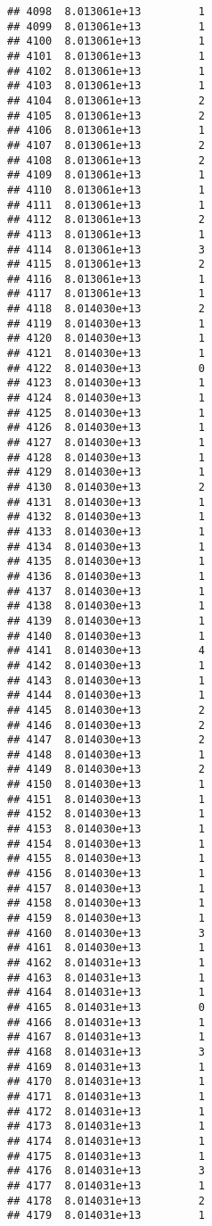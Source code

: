 \documentclass[
]{article}
\begin{document}
\begin{verbatim}
## 4098  8.013061e+13         1
## 4099  8.013061e+13         1
## 4100  8.013061e+13         1
## 4101  8.013061e+13         1
## 4102  8.013061e+13         1
## 4103  8.013061e+13         1
## 4104  8.013061e+13         2
## 4105  8.013061e+13         2
## 4106  8.013061e+13         1
## 4107  8.013061e+13         2
## 4108  8.013061e+13         2
## 4109  8.013061e+13         1
## 4110  8.013061e+13         1
## 4111  8.013061e+13         1
## 4112  8.013061e+13         2
## 4113  8.013061e+13         1
## 4114  8.013061e+13         3
## 4115  8.013061e+13         2
## 4116  8.013061e+13         1
## 4117  8.013061e+13         1
## 4118  8.014030e+13         2
## 4119  8.014030e+13         1
## 4120  8.014030e+13         1
## 4121  8.014030e+13         1
## 4122  8.014030e+13         0
## 4123  8.014030e+13         1
## 4124  8.014030e+13         1
## 4125  8.014030e+13         1
## 4126  8.014030e+13         1
## 4127  8.014030e+13         1
## 4128  8.014030e+13         1
## 4129  8.014030e+13         1
## 4130  8.014030e+13         2
## 4131  8.014030e+13         1
## 4132  8.014030e+13         1
## 4133  8.014030e+13         1
## 4134  8.014030e+13         1
## 4135  8.014030e+13         1
## 4136  8.014030e+13         1
## 4137  8.014030e+13         1
## 4138  8.014030e+13         1
## 4139  8.014030e+13         1
## 4140  8.014030e+13         1
## 4141  8.014030e+13         4
## 4142  8.014030e+13         1
## 4143  8.014030e+13         1
## 4144  8.014030e+13         1
## 4145  8.014030e+13         2
## 4146  8.014030e+13         2
## 4147  8.014030e+13         2
## 4148  8.014030e+13         1
## 4149  8.014030e+13         2
## 4150  8.014030e+13         1
## 4151  8.014030e+13         1
## 4152  8.014030e+13         1
## 4153  8.014030e+13         1
## 4154  8.014030e+13         1
## 4155  8.014030e+13         1
## 4156  8.014030e+13         1
## 4157  8.014030e+13         1
## 4158  8.014030e+13         1
## 4159  8.014030e+13         1
## 4160  8.014030e+13         3
## 4161  8.014030e+13         1
## 4162  8.014031e+13         1
## 4163  8.014031e+13         1
## 4164  8.014031e+13         1
## 4165  8.014031e+13         0
## 4166  8.014031e+13         1
## 4167  8.014031e+13         1
## 4168  8.014031e+13         3
## 4169  8.014031e+13         1
## 4170  8.014031e+13         1
## 4171  8.014031e+13         1
## 4172  8.014031e+13         1
## 4173  8.014031e+13         1
## 4174  8.014031e+13         1
## 4175  8.014031e+13         1
## 4176  8.014031e+13         3
## 4177  8.014031e+13         1
## 4178  8.014031e+13         2
## 4179  8.014031e+13         1

\end{verbatim}
\end{document}
